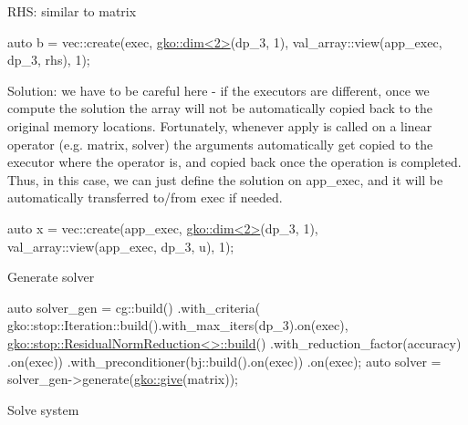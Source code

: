 R\+HS\+: similar to matrix


\begin{DoxyCode}
\textcolor{keyword}{auto} b = vec::create(exec, \hyperlink{structgko_1_1dim}{gko::dim<2>}(dp\_3, 1),
                     val\_array::view(app\_exec, dp\_3, rhs), 1);
\end{DoxyCode}


Solution\+: we have to be careful here -\/ if the executors are different, once we compute the solution the array will not be automatically copied back to the original memory locations. Fortunately, whenever {\ttfamily apply} is called on a linear operator (e.\+g. matrix, solver) the arguments automatically get copied to the executor where the operator is, and copied back once the operation is completed. Thus, in this case, we can just define the solution on {\ttfamily app\+\_\+exec}, and it will be automatically transferred to/from {\ttfamily exec} if needed.


\begin{DoxyCode}
\textcolor{keyword}{auto} x = vec::create(app\_exec, \hyperlink{structgko_1_1dim}{gko::dim<2>}(dp\_3, 1),
                     val\_array::view(app\_exec, dp\_3, u), 1);
\end{DoxyCode}


Generate solver


\begin{DoxyCode}
\textcolor{keyword}{auto} solver\_gen =
    cg::build()
        .with\_criteria(
            gko::stop::Iteration::build().with\_max\_iters(dp\_3).on(exec),
            \hyperlink{classgko_1_1stop_1_1ResidualNormReduction}{gko::stop::ResidualNormReduction<>::build}()
                .with\_reduction\_factor(accuracy)
                .on(exec))
        .with\_preconditioner(bj::build().on(exec))
        .on(exec);
\textcolor{keyword}{auto} solver = solver\_gen->generate(\hyperlink{namespacegko_acbd3fd6d07e498892881e8e2ab0b4167}{gko::give}(matrix));
\end{DoxyCode}


Solve system


